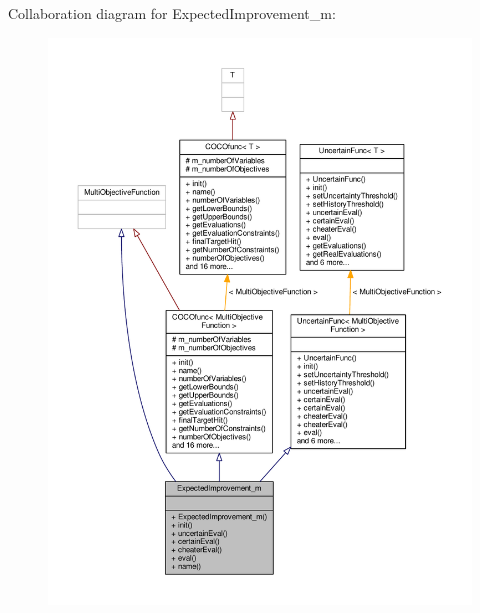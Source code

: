 Collaboration diagram for Expected\+Improvement\+\_\+m\+:
\nopagebreak
\begin{figure}[H]
\begin{center}
\leavevmode
\includegraphics[width=350pt]{classExpectedImprovement__m__coll__graph}
\end{center}
\end{figure}
